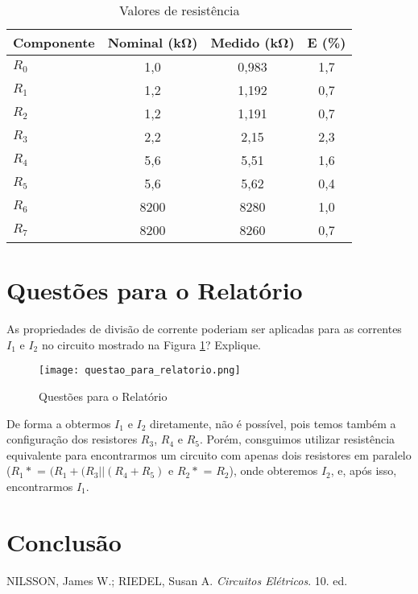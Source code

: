 \documentclass[a4paper, 12pt]{article}
\begin{document}
\begin{table}[H]
\centering
\caption{Valores de resistência}
\label{tab:resistencias}
\begin{tabular}{|l|c|c|c|}
\hline
\textbf{Componente} & \textbf{Nominal (\si{\kilo\ohm})} & \textbf{Medido (\si{\kilo\ohm})} & \textbf{E (\%)} \\
\hline
$R_0$ & 1,0 & 0,983 & 1,7 \\ \hline
$R_1$ & 1,2 & 1,192 & 0,7 \\ \hline
$R_2$ & 1,2 & 1,191 & 0,7 \\ \hline
$R_3$ & 2,2 & 2,15 & 2,3 \\ \hline
$R_4$ & 5,6 & 5,51 & 1,6 \\ \hline
$R_5$ & 5,6 & 5,62 & 0,4 \\ \hline
$R_6$ & 8200 & 8280 & 1,0 \\ \hline
$R_7$ & 8200 & 8260 & 0,7 \\ \hline
\end{tabular}
\end{table}

\section{Questões para o Relatório}
As propriedades de divisão de corrente poderiam ser aplicadas para as correntes $I_{1}$ e $I_{2}$ no
circuito mostrado na Figura \ref{fig:questao_para_relatorio}? Explique.

\begin{figure}[H]
\centering
\texttt{[image: questao\_para\_relatorio.png]}
\caption{Questões para o Relatório}
\label{fig:questao_para_relatorio}
\end{figure}

De forma a obtermos $I_1$ e $I_2$ diretamente, não é possível, pois temos também a configuração dos resistores $R_3$, $R_4$ e $R_5$. Porém, consguimos utilizar resistência equivalente para encontrarmos um circuito com apenas dois resistores em paralelo ($R_1*$ = $(R_1+(R_3||(R_4+R_5)$ e $R_2*$ = $R_2$), onde obteremos $I_2$, e, após isso, encontrarmos $I_1$. 

\section{Conclusão}


\begin{thebibliography}{9}

NILSSON, James W.; RIEDEL, Susan A. \textit{Circuitos Elétricos}. 10. ed.

\end{thebibliography}
\end{document}
